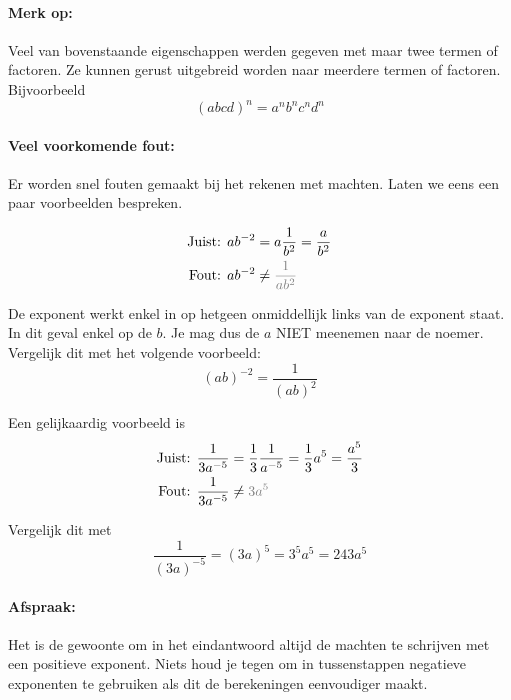 \documentclass[12pt,twoside]{article}
\begin{document}
\paragraph{Merk op:} Veel van bovenstaande eigenschappen werden gegeven met maar twee termen of factoren. Ze kunnen gerust uitgebreid worden naar meerdere termen of factoren. Bijvoorbeeld $$(abcd)^n=a^nb^nc^nd^n$$

\paragraph{Veel voorkomende fout:} Er worden snel fouten gemaakt bij het rekenen met machten. Laten we eens een paar voorbeelden bespreken.

\begin{align*}
  \text{Juist: } ab^{-2} &= a\dfrac{1}{b^2} = \dfrac{a}{b^2}\\
  \text{Fout:  } ab^{-2} &\neq \color{gray}{\dfrac{1}{ab^2}}
\end{align*}

De exponent werkt enkel in op hetgeen onmiddellijk links van de exponent staat. In dit geval enkel op de $b$. Je mag dus de $a$ NIET meenemen naar de noemer. Vergelijk dit met het volgende voorbeeld:
$$ (ab)^{-2} = \dfrac{1}{(ab)^2} $$

Een gelijkaardig voorbeeld is
\begin{align*}
  \text{Juist: } \dfrac{1}{3a^{-5}} &= \dfrac{1}{3}\dfrac{1}{a^{-5}} = \dfrac{1}{3}a^5 = \dfrac{a^5}{3}\\
  \text{Fout:  } \dfrac{1}{3a^{-5}} &\neq \color{gray}{3a^5}
\end{align*}

Vergelijk dit met
$$\dfrac{1}{(3a)^{-5}} = (3a)^5 = 3^5 a^5 = 243 a^5$$

\paragraph{Afspraak:} Het is de gewoonte om in het eindantwoord altijd de machten te schrijven met een positieve exponent. Niets houd je tegen om in tussenstappen negatieve exponenten te gebruiken als dit de berekeningen eenvoudiger maakt.
\end{document}
